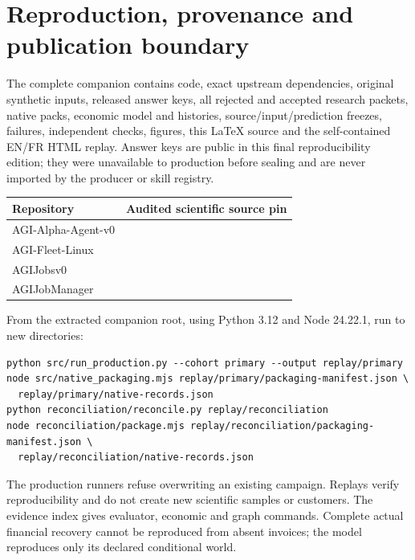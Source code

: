 \documentclass[10pt,a4paper]{article}
\begin{document}
\appendix
\section{Reproduction, provenance and publication boundary}\label{app:reproduce}
The complete companion contains code, exact upstream dependencies, original synthetic inputs, released answer keys, all rejected and accepted research packets, native packs, economic model and histories, source/input/prediction freezes, failures, independent checks, figures, this LaTeX source and the self-contained EN/FR HTML replay. Answer keys are public in this final reproducibility edition; they were unavailable to production before sealing and are never imported by the producer or skill registry.

\begin{table}[H]\small
\begin{tabularx}{\textwidth}{@{}p{}Y@{}}\toprule
\textbf{Repository} & \textbf{Audited scientific source pin}\\\midrule
AGI-Alpha-Agent-v0 & \\
AGI-Fleet-Linux & \\
AGIJobsv0 & \\
AGIJobManager & \\\bottomrule
\end{tabularx}
\end{table}

From the extracted companion root, using Python 3.12 and Node 24.22.1, run to new directories:
\par\vspace{0.3em}
\begin{minipage}{\textwidth}
\begin{verbatim}
python src/run_production.py --cohort primary --output replay/primary
node src/native_packaging.mjs replay/primary/packaging-manifest.json \
  replay/primary/native-records.json
python reconciliation/reconcile.py replay/reconciliation
node reconciliation/package.mjs replay/reconciliation/packaging-manifest.json \
  replay/reconciliation/native-records.json
\end{verbatim}
\end{minipage}
\par\vspace{0.3em}
The production runners refuse overwriting an existing campaign. Replays verify reproducibility and do not create new scientific samples or customers. The evidence index gives evaluator, economic and graph commands. Complete actual financial recovery cannot be reproduced from absent invoices; the model reproduces only its declared conditional world.
\end{document}
